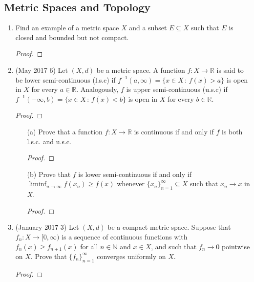 \documentclass[reqno]{article}
\theoremstyle{remark}
\numberwithin{equation}{section}
\newcommand{\N}{\mathbb{N}}
\newcommand{\R}{\mathbb{R}}
\begin{document}
\subsection*{Metric Spaces and Topology} 

\begin{enumerate} 

\item Find an example of a metric space $X$ and a subset $E \subseteq X$ such that $E$ is closed and bounded but not compact. 

	\begin{proof}
    
    \end{proof}

\item (May 2017 6) Let $(X,d)$ be a metric space. A function $f \colon X \to \R$ is said to be lower semi-continuous (l.s.c) if $f^{-1}(a,\infty)  = \{x \in X \, \colon \,  f(x)> a\}$ is open in $X$ for every $a \in \R$. Analogously, $f$ is upper semi-continuous (u.s.c) if $f^{-1}(-\infty, b) = \{x \in X \, \colon \,  f(x)<b\}$ is open in $X$ for every $b \in \R$. 

	\begin{proof}
    
    \end{proof}

\begin{enumerate} 

\item[(a)] Prove that a function $f \colon X \to \R$ is continuous if and only if $f$ is both l.s.c. and u.s.c. 

	\begin{proof}
    
    \end{proof}

\item[(b)] Prove that $f$ is lower semi-continuous if and only if $\liminf_{n \to \infty} f(x_n) \geq f(x)$  whenever $\{x_n\}_{n=1}^\infty \subseteq X$ such that $x_n \to x$ in $X$. 
	\begin{proof}
    
    \end{proof}

\end{enumerate} 

\item (January 2017 3) Let $(X,d)$ be a compact metric space. Suppose that $f_n \colon X \to [0,\infty)$ is a sequence of continuous functions with $f_n(x) \geq f_{n+1}(x)$ for all $n \in \N$ and $x \in X$, and such that $f_n \to 0$ pointwise on $X$. Prove that $\{f_n\}_{n=1}^\infty$ converges uniformly on $X$. 

	\begin{proof}
    
    \end{proof}

\end{enumerate} 
\end{document}
